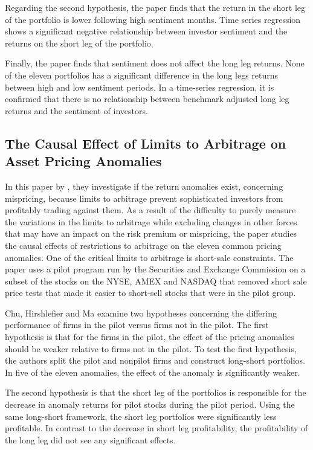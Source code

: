 \documentclass[12pt, a4paper, oneside]{article}
\begin{document}
Regarding the second hypothesis, the paper finds that the return in the short leg of the portfolio is lower following high sentiment months. Time series regression shows a significant negative relationship between investor sentiment and the returns on the short leg of the portfolio.

Finally, the paper finds that sentiment does not affect the long leg returns. None of the eleven portfolios has a significant difference in the long legs returns between high and low sentiment periods. In a time-series regression, it is confirmed that there is no relationship between benchmark adjusted long leg returns and the sentiment of investors.

\subsection{The Causal Effect of Limits to Arbitrage on Asset Pricing Anomalies}
In this paper by , they investigate if the return anomalies exist, concerning mispricing, because limits to arbitrage prevent sophisticated investors from profitably trading against them. As a result of the difficulty to purely measure the variations in the limits to arbitrage while excluding changes in other forces that may have an impact on the risk premium or mispricing, the paper studies the causal effects of restrictions to arbitrage on the eleven common pricing anomalies. One of the critical limits to arbitrage is short-sale constraints. The paper uses a pilot program run by the Securities and Exchange Commission on a subset of the stocks on the NYSE, AMEX and NASDAQ that removed short sale price tests that made it easier to short-sell stocks that were in the pilot group. 

Chu, Hirshlefier and Ma examine two hypotheses concerning the differing performance of firms in the pilot versus firms not in the pilot. The first hypothesis is that for the firms in the pilot, the effect of the pricing anomalies should be weaker relative to firms not in the pilot. To test the first hypothesis, the authors split the pilot and nonpilot firms and construct long-short portfolios. In five of the eleven anomalies, the effect of the anomaly is significantly weaker.

The second hypothesis is that the short leg of the portfolios is responsible for the decrease in anomaly returns for pilot stocks during the pilot period. Using the same long-short framework, the short leg portfolios were significantly less profitable. In contrast to the decrease in short leg profitability, the profitability of the long leg did not see any significant effects.
\end{document}
